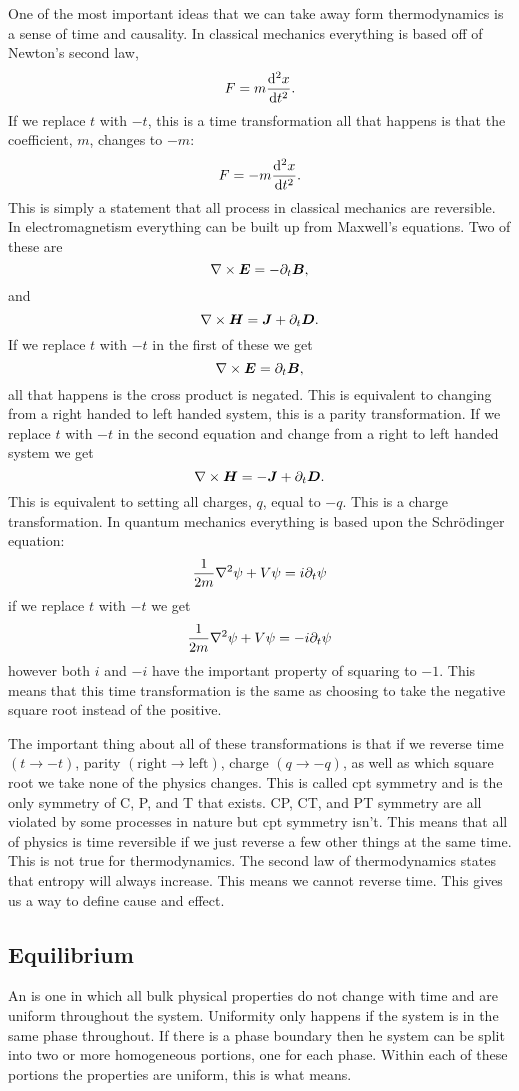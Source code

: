 \documentclass[a4paper]{article}
\begin{document}
    One of the most important ideas that we can take away form thermodynamics is a sense of time and causality.
    In classical mechanics everything is based off of Newton's second law,
    \[F = m\dv[2]{x}{t}.\]
    If we replace \(t\) with \(-t\), this is a time transformation all that happens is that the coefficient, \(m\), changes to \(-m\):
    \[F = -m\dv[2]{x}{t}.\]
    This is simply a statement that all process in classical mechanics are reversible.
    In electromagnetism everything can be built up from Maxwell's equations.
    Two of these are
    \[\nabla\times\bm{E} = -\partial_t\bm{B},\]
    and
    \[\nabla\times\bm{H} = \bm{J} + \partial_t\bm{D}.\]
    If we replace \(t\) with \(-t\) in the first of these we get
    \[\nabla\times\bm{E} = \partial_t\bm{B},\]
    all that happens is the cross product is negated.
    This is equivalent to changing from a right handed to left handed system, this is a parity transformation.
    If we replace \(t\) with \(-t\) in the second equation and change from a right to left handed system we get
    \[\nabla\times\bm{H} = -\bm{J} + \partial_t\bm{D}.\]
    This is equivalent to setting all charges, \(q\), equal to \(-q\).
    This is a charge transformation.
    In quantum mechanics everything is based upon the Schr\"odinger equation:
    \[\frac{1}{2m}\nabla^2\psi + V\psi = i\partial_t\psi\]
    if we replace \(t\) with \(-t\) we get
    \[\frac{1}{2m}\nabla^2\psi + V\psi = -i\partial_t\psi\]
    however both \(i\) and \(-i\) have the important property of squaring to \(-1\).
    This means that this time transformation is the same as choosing to take the negative square root instead of the positive.
    
    The important thing about all of these transformations is that if we reverse time \((t \to -t)\), parity \((\text{right}\to\text{left})\), charge \((q\to-q)\), as well as which square root we take none of the physics changes.
    This is called \acrfull{cpt} symmetry and is the only symmetry of C, P, and T that exists.
    CP, CT, and PT symmetry are all violated by some processes in nature but \acrshort{cpt} symmetry isn't.
    This means that all of physics is time reversible if we just reverse a few other things at the same time.
    This is not true for thermodynamics.
    The second law of thermodynamics states that entropy will always increase.
    This means we cannot reverse time.
    This gives us a way to define cause and effect.
    
    \subsection{Equilibrium}
    An  is one in which all bulk physical properties do not change with time and are uniform throughout the system.
    Uniformity only happens if the system is in the same phase throughout.
    If there is a phase boundary then he system can be split into two or more homogeneous portions, one for each phase.
    Within each of these portions the properties are uniform, this is what  means.
    
\end{document}
